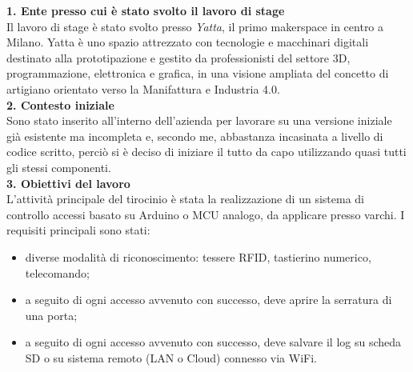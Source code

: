 \documentclass[11pt]{article}
\begin{document}
	\noindent\textbf{\large 1. Ente presso cui è stato svolto il lavoro di stage} \\
	\newline 
	Il lavoro di stage è stato svolto presso \emph{Yatta}, il primo makerspace in centro a Milano. Yatta è uno spazio attrezzato con tecnologie e macchinari digitali destinato alla prototipazione
	e gestito da professionisti del settore 3D, programmazione, elettronica e grafica, in una
	visione ampliata del concetto di artigiano orientato verso la Manifattura e Industria
	4.0.  \\
	\newline
	\noindent\textbf{\large 2. Contesto iniziale} \\
	\newline 
	Sono stato inserito all'interno dell'azienda per lavorare su una versione iniziale già esistente ma incompleta e, secondo me, abbastanza incasinata a livello di codice scritto, perciò si è deciso di iniziare il tutto da capo utilizzando quasi tutti gli stessi componenti.  \\
	\newline
	\noindent\textbf{\large 3. Obiettivi del lavoro} \\
	\newline 
	L’attività principale del tirocinio è stata la realizzazione di un sistema di controllo accessi basato su Arduino o MCU analogo, da applicare presso varchi. I requisiti principali sono stati: 
	\begin{itemize}
		\item diverse modalità di riconoscimento: tessere RFID, tastierino numerico, telecomando;
		\item a seguito di ogni accesso avvenuto con successo, deve aprire la serratura di una porta;
		\item a seguito di ogni accesso avvenuto con successo, deve salvare il log su scheda SD o su sistema remoto (LAN o Cloud) connesso via WiFi.  \\ 
	\end{itemize} 
\end{document}
